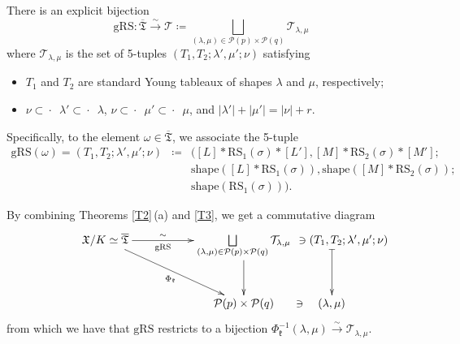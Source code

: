 \documentclass[ALCO,Unicode]{cedram}
\newcommand{\fk}{\mathfrak{k}}
\newcommand{\RS}{\mathrm{RS}}
\newcommand{\shape}{\mathrm{shape}}
\newcommand{\genRS}{\mathrm{gRS}}
\newcommand{\partitionsof}[1]{\mathcal{P}(#1)}
\newcommand{\ppermutationsof}{\mathfrak{T}}
\newcommand{\parameters}{\overline{\ppermutationsof}}
\newcommand{\columnstrip}{\subset\!\!\!\!\!\cdot\,\,\,}
\newcommand{\Xfv}{\mathfrak{X}}
\begin{document}
\begin{theorem}
\label{T3}
There is an explicit bijection
\[
\mathrm{gRS}:\parameters\stackrel{\sim}{\longrightarrow}\mathcal{T}\coloneqq \bigsqcup_{(\lambda,\mu)\in\partitionsof{p}\times\partitionsof{q}} \mathcal{T}_{\lambda,\mu}
\]
where $\mathcal{T}_{\lambda,\mu}$ is the set of 5-tuples
$(T_1,T_2;\lambda',\mu';\nu)$ satisfying
\begin{itemize}
\item[$(\star)$] $T_1$ and $T_2$ are standard Young tableaux of shapes $\lambda$ and $\mu$, respectively;
\item[$(\star\star)$] $\nu\columnstrip\lambda'\columnstrip\lambda$,
$\nu\columnstrip\mu'\columnstrip\mu$, and $|\lambda'|+|\mu'|=|\nu|+r$.
\end{itemize}
Specifically, to the element $\omega\in\parameters$, we associate
the 5-tuple
\begin{eqnarray*}
\mathrm{gRS}(\omega)=(T_1,T_2;\lambda',\mu';\nu)&\coloneqq &\big([L]*\RS_1(\sigma)*[L'],[M]*\RS_2(\sigma)*[M'];\\
&&\shape([L]*\RS_1(\sigma)),\shape([M]*\RS_2(\sigma));\\
&&\shape(\RS_1(\sigma))\big).
\end{eqnarray*}
\end{theorem}

By combining Theorems \ref{T2}\,(a) and \ref{T3}, we get a commutative diagram
\[
\xymatrix  @M 3pt @R 8ex{
\Xfv / K \simeq \parameters
\ar[drr]_{\Phi_\fk} \ar@{->}[rr]^-{\sim}_-{\genRS} & & \bigsqcup\limits_{(\lambda, \mu) \in \partitionsof{p} \times \partitionsof{q}}
\mathcal{T}_{\lambda,\mu}
\ar[d] &
\makebox[3ex][c]{\qquad$\ni (T_1, T_2; \lambda', \mu'; \nu)$} \ar@{|->}[d]\\
& & \partitionsof{p} \times \partitionsof{q} & \makebox[0ex][c]{$\ni \quad (\lambda, \mu) $\qquad} }
\]
from which we have that $\genRS$ restricts to a bijection
$\Phi_\fk^{-1}(\lambda,\mu)\stackrel{\sim}{\to} \mathcal{T}_{\lambda,\mu}$.
\end{document}
